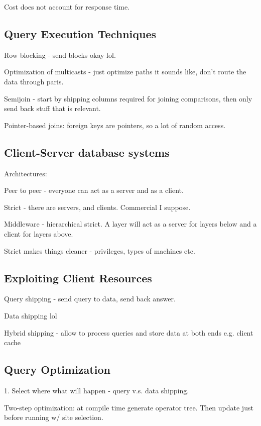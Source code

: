 \documentclass{article}
\begin{document}
		Cost does not account for response time.
		
	\subsection{Query Execution Techniques}
	
		Row blocking - send blocks okay lol.
		
		Optimization of multicasts - just optimize paths it sounds like, don't route the data through paris.
		
		Semijoin - start by shipping columns required for joining comparisons, then only send back stuff that is relevant.
		
		Pointer-based joins: foreign keys are pointers, so a lot of random access.
		
	\subsection{Client-Server database systems}
	
		Architectures:
		
		Peer to peer - everyone can act as a server and as a client.
		
		Strict - there are servers, and clients. Commercial I suppose.
		
		Middleware - hierarchical strict. A layer will act as a server for layers below and a client for layers above.
		
		Strict makes things cleaner - privileges, types of machines etc.
		
	\subsection{Exploiting Client Resources}
	
		Query shipping - send query to data, send back answer.
		
		Data shipping lol
		
		Hybrid shipping - allow to process queries and store data at both ends e.g. client cache
		
	\subsection{Query Optimization}
	
		1. Select where what will happen - query v.s. data shipping.
		
		Two-step optimization: at compile time generate operator tree. Then update just before running w/ site selection.
		
\end{document}

